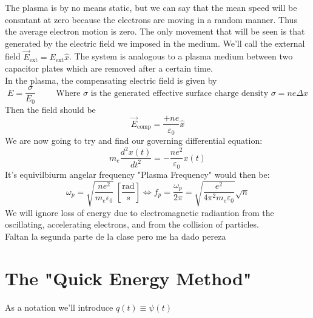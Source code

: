 \documentclass{report}
\begin{document}
        \noindent The plasma is by no means static, but we can say that the mean speed will be consntant at zero because the electrons are moving in a random manner. Thus the average electron motion is zero. The only movement that will be seen is that generated by the electric field we imposed in the medium. We'll call the external field $\vec{E}_{\text{ext}}=E_\text{ext}\hat{x}$. The system is analogous to a plasma medium between two capacitor plates which are removed after a certain time.\\

        \noindent In the plasma, the compensating electric field is given by 
        \[E=\dfrac{\sigma}{E_0}\hspace{1cm}\text{Where }\sigma \text{ is the generated effective surface charge density }\sigma=ne\Delta x\]
        \noindent Then the field should be
        \[\vec{E}_\text{comp}=\dfrac{+ne}{\varepsilon_0}\hat{x}\]
        \noindent We are now going to try and find our governing differential equation:
        \begin{equation}
          m_e\dfrac{d^2x(t)}{dt^2}=-\dfrac{ne^2}{\varepsilon_0}x(t)
        \end{equation}
        \noindent It's equivilbiurm angelar frequency "Plasma Frequency" would then be:
        \begin{equation}
          \omega_p=\sqrt{\dfrac{ne^2}{m_e\epsilon_0}}\ \left[\dfrac{\text{rad}}{s}\right] \Longleftrightarrow f_p=\dfrac{\omega_p}{2\pi}=\sqrt{\dfrac{e^2}{4\pi^2 m_e\varepsilon_0}}\sqrt{n}
        \end{equation}
        \noindent We will ignore loss of energy due to electromagnetic radiantion from the oscillating, accelerating electrons, and from the collision of particles.\\

        \noindent Faltan la segunda parte de la clase pero me ha dado pereza
        \clearpage
      \section{The "Quick Energy Method"}
        \noindent As a notation we'll introduce $q(t)\equiv\psi(t)$ 
\end{document}
